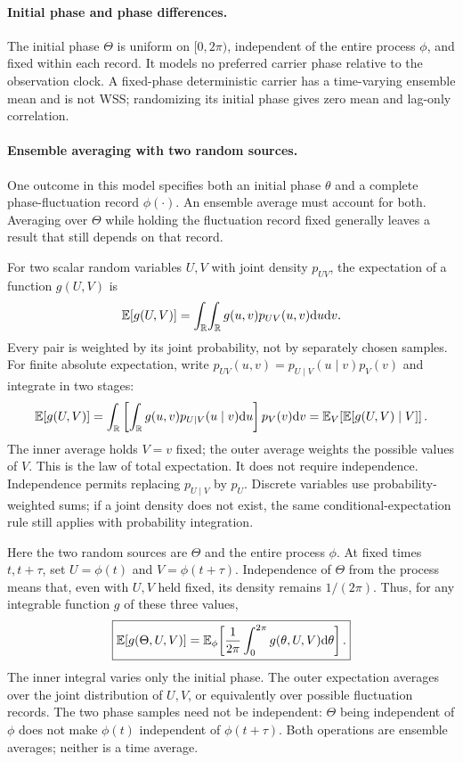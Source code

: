 \paragraph{Initial phase and phase differences.}
The initial phase $\Theta$ is uniform on $[0,2\pi)$, independent of the entire process $\phi$, and fixed within each record. It models no preferred carrier phase relative to the observation clock. A fixed-phase deterministic carrier has a time-varying ensemble mean and is not WSS; randomizing its initial phase gives zero mean and lag-only correlation.

\paragraph{Ensemble averaging with two random sources.}
One outcome in this model specifies both an initial phase $\theta$ and a complete phase-fluctuation record $\phi(\cdot)$. An ensemble average must account for both. Averaging over $\Theta$ while holding the fluctuation record fixed generally leaves a result that still depends on that record.

For two scalar random variables $U,V$ with joint density $p_{UV}$, the expectation of a function $g(U,V)$ is
\[
\mathbb E[g(U,V)]=\int_{\mathbb R}\!\int_{\mathbb R}
g(u,v)p_{UV}(u,v)\mathrm d u\mathrm d v.
\]
Every pair is weighted by its joint probability, not by separately chosen samples. For finite absolute expectation, write $p_{UV}(u,v)=p_{U\mid V}(u\mid v)p_V(v)$ and integrate in two stages:
\[
\mathbb E[g(U,V)]
=\int_{\mathbb R}\left[\int_{\mathbb R}g(u,v)p_{U\mid V}(u\mid v)\mathrm d u\right]p_V(v)\mathrm d v
=\mathbb E_V\!\left[\mathbb E[g(U,V)\mid V]\right].
\]
The inner average holds $V=v$ fixed; the outer average weights the possible values of $V$. This is the law of total expectation. It does not require independence. Independence permits replacing $p_{U\mid V}$ by $p_U$. Discrete variables use probability-weighted sums; if a joint density does not exist, the same conditional-expectation rule still applies with probability integration.

Here the two random sources are $\Theta$ and the entire process $\phi$. At fixed times $t,t+\tau$, set $U=\phi(t)$ and $V=\phi(t+\tau)$. Independence of $\Theta$ from the process means that, even with $U,V$ held fixed, its density remains $1/(2\pi)$. Thus, for any integrable function $g$ of these three values,
\[
\boxed{\mathbb E[g(\Theta,U,V)]
=\mathbb E_\phi\!\left[\frac1{2\pi}\int_0^{2\pi}g(\theta,U,V)\mathrm d\theta\right].}
\]
The inner integral varies only the initial phase. The outer expectation averages over the joint distribution of $U,V$, or equivalently over possible fluctuation records. The two phase samples need not be independent: $\Theta$ being independent of $\phi$ does not make $\phi(t)$ independent of $\phi(t+\tau)$. Both operations are ensemble averages; neither is a time average.


